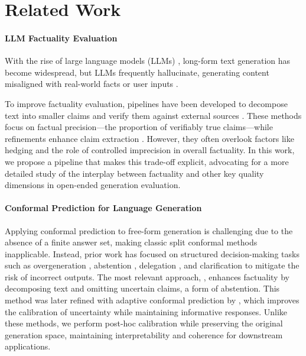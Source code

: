 \section{Related Work}
\paragraph{LLM Factuality Evaluation} With the rise of large language models (LLMs) \citep{brown2020language, ouyang2022training}, long-form text generation has become widespread, but LLMs frequently hallucinate, generating content misaligned with real-world facts or user inputs \citep{maynez2020faithfulness, huang2023survey, hong2024hallucinations}.

To improve factuality evaluation, pipelines have been developed to decompose text into smaller claims and verify them against external sources \citep{min-etal-2023-factscore, wang-etal-2024-factcheck, wanner-etal-2024-closer}. These methods focus on factual precision—the proportion of verifiably true claims—while refinements enhance claim extraction \citep{wanner2024dndscore, gunjal-durrett-2024-molecular, jiang2024core}. However, they often overlook factors like hedging \citep{lee2024llm} and the role of controlled imprecision in overall factuality.
In this work, we propose a pipeline that makes this trade-off explicit, advocating for a more detailed study of the interplay between factuality and other key quality dimensions in open-ended generation evaluation.


\paragraph{Conformal Prediction for Language Generation} Applying conformal prediction to free-form generation is challenging due to the absence of a finite answer set, making classic split conformal methods inapplicable. Instead, prior work has focused on structured decision-making tasks such as overgeneration \citep{quachconformal}, abstention \citep{kamath2020selective, yadkori2024mitigating, gui2024conformal, piche2024llms}, delegation \citep{fang2024learning}, and clarification \citep{renrobots} to mitigate the risk of incorrect outputs. The most relevant approach, \citet{mohri2024language}, enhances factuality by decomposing text and omitting uncertain claims, a form of abstention. This method was later refined with adaptive conformal prediction by \citet{cherian2024large}, which improves the calibration of uncertainty while maintaining informative responses. Unlike these methods, we perform post-hoc calibration while preserving the original generation space, maintaining interpretability and coherence for downstream applications.

